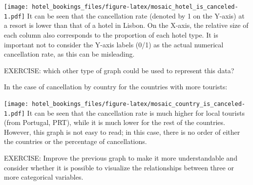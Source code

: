 \documentclass[
]{article}
\newenvironment{Shaded}{\begin{snugshade}}{\end{snugshade}}
\newcommand{\AttributeTok}[1]{\textcolor[rgb]{0.13,0.29,0.53}{#1}}
\newcommand{\CommentTok}[1]{\textcolor[rgb]{0.56,0.35,0.01}{\textit{#1}}}
\newcommand{\DecValTok}[1]{\textcolor[rgb]{0.00,0.00,0.81}{#1}}
\newcommand{\FloatTok}[1]{\textcolor[rgb]{0.00,0.00,0.81}{#1}}
\newcommand{\FunctionTok}[1]{\textcolor[rgb]{0.13,0.29,0.53}{\textbf{#1}}}
\newcommand{\NormalTok}[1]{#1}
\newcommand{\OtherTok}[1]{\textcolor[rgb]{0.56,0.35,0.01}{#1}}
\newcommand{\SpecialCharTok}[1]{\textcolor[rgb]{0.81,0.36,0.00}{\textbf{#1}}}
\begin{document}
\texttt{[image: hotel\_bookings\_files/figure-latex/mosaic\_hotel\_is\_canceled-1.pdf]}
It can be seen that the cancellation rate (denoted by 1 on the Y-axis)
at a resort is lower than that of a hotel in Lisbon. On the X-axis, the
relative size of each column also corresponds to the proportion of each
hotel type. It is important not to consider the Y-axis labels (0/1) as
the actual numerical cancellation rate, as this can be misleading.

EXERCISE: which other type of graph could be used to represent this
data?

In the case of cancellation by country for the countries with more
tourists:

\begin{Shaded}
\end{Shaded}

\texttt{[image: hotel\_bookings\_files/figure-latex/mosaic\_country\_is\_canceled-1.pdf]}
It can be seen that the cancellation rate is much higher for local
tourists (from Portugal, PRT), while it is much lower for the rest of
the countries. However, this graph is not easy to read; in this case,
there is no order of either the countries or the percentage of
cancellations.

EXERCISE: Improve the previous graph to make it more understandable and
consider whether it is possible to visualize the relationships between
three or more categorical variables.
\end{document}
